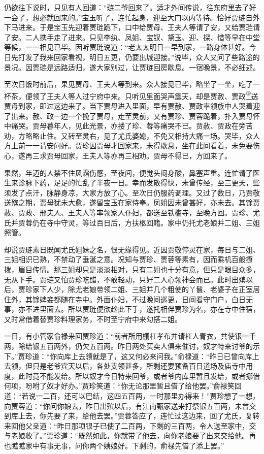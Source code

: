 仍欲往下说时，只见有人回道：``琏二爷回来了。适才外间传说，往东府里去了好一会了，想必就回来的。''宝玉听了，连忙起身，迎至大门以内等待。恰好贾琏自外下马进来。于是宝玉先迎着贾琏跪下，口中给贾母、王夫人等请了安，又给贾琏请了安。二人携手走了进来。只见李纨、凤姐、宝钗、黛玉、迎、探、惜等早在中堂等候，一一相见已毕。因听贾琏说道：``老太太明日一早到家，一路身体甚好。今日先打发了我来回家看视，明日五更，仍要出城迎接。''说毕，众人又问了些路途的景况。因贾琏是远路适归，遂大家别过，让贾琏回房歇息。一宿晚景，不必细述。

至次日饭时前后，果见贾母、王夫人等到来。众人接见已毕，略坐了一坐，吃了一杯茶，便领了王夫人等人过宁府中来。只听见里面哭声震天，却是贾赦、贾政\href{../Text/part0068_split_000.html\#lnkback_3_a}{\textsuperscript{③}}送贾母到家，即过这边来了。当下贾母进入里面，早有贾赦、贾政率领族中人哭着迎了出来。赦、政一边一个挽了贾母，走至灵前，又有贾珍、贾蓉跪着，扑入贾母怀中痛哭。贾母暮年人，见此光景，亦搂了珍、蓉等痛哭不已。贾赦、贾政在旁苦劝，方略略止住。又转至灵右，见了尤氏婆媳，不免又相持大痛一场。哭毕，众人方上前一一请安问好。贾珍因贾母才回家来，未得歇息，坐在此间看着，未免要伤心，遂再三求贾母回家，王夫人等亦再三相劝。贾母不得已，方回来了。

果然，年迈的人禁不住风霜伤感，至夜间，便觉头闷身酸，鼻塞声重。连忙请了医生来诊脉下药，足足的忙乱了半夜一日。幸而发散得快，未曾传经，至三更天，些须发了点汗，脉静身凉，大家方放了心。至次日仍服药调理。又过了数日，乃贾敬送殡之期，贾母犹未大愈，遂留宝玉在家侍奉。凤姐因未曾甚好，亦未去。其馀贾赦、贾政、邢夫人、王夫人等率领家人仆妇，都送至铁槛寺，至晚方回。贾珍、尤氏并贾蓉仍在寺中守灵，等过百日后，方扶柩回籍。家中仍托尤老娘并二姐、三姐照管。

却说贾琏素日既闻尤氏姐妹之名，恨无缘得见。近因贾敬停灵在家，每日与二姐、三姐相识已熟，不禁动了垂涎之意。况知与贾珍、贾蓉等素有，因而乘机百般撩拨，眉目传情。那三姐却只是淡淡相对，只有二姐也十分有意，但只是眼目众多，无从下手。贾琏又怕贾珍吃醋，不敢轻动，只好二人心领神会而已。此时出殡以后，贾珍家下人少，除尤老娘带领二姐、三姐并几个粗使的丫鬟、老婆子在正室居住外，其馀婢妾都随在寺中。外面仆妇，不过晚间巡更，日间看守门户，白日无事，亦不进里面去。所以贾琏便欲趁此下手，遂托相伴贾珍为名，亦在寺中住宿，又时常借着替贾珍料理家务，不时至宁府中来勾搭二姐。

一日，有小管家俞禄来回贾珍道：``前者所用棚杠孝布并请杠人青衣，共使银一千两，除给银五百两外，仍欠五百两。昨日两处买卖人俱来催讨，奴才特来讨爷的示下。''贾珍道：``你向库上去领就是了，这又何必来问我。''俞禄道：``昨日已曾向库上去领，但只是老爷宾天以后，各处支领甚多，所剩还要预备百日道场及庙寺中用度，此时竟不能发给。所以奴才今日特来回爷，或者爷内库里暂且发给，或者挪借何项，吩咐了奴才好办。''贾珍笑道：``你无论那里暂且借了给他罢。''俞禄笑回道：``若说一二百，还可以巴结，这四五百两，一时那里办得来！''贾珍想了一想，向贾蓉道：``你问你娘去，昨日出殡以后，有江南甄家送来打祭银五百两，未曾交到库上去，你先要了来，给他去罢。''贾蓉答应了，连忙过这边来，回了尤氏，复转来回他父亲道：``昨日那项银子已使了二百两，下剩的三百两，令人送至家中，交与老娘收了。''贾珍道：``既然如此，你就带了他去，向你老娘要了出来交给他。再也瞧瞧家中有事无事，问你两个姨娘好。下剩的，俞禄先借了添上罢。''


